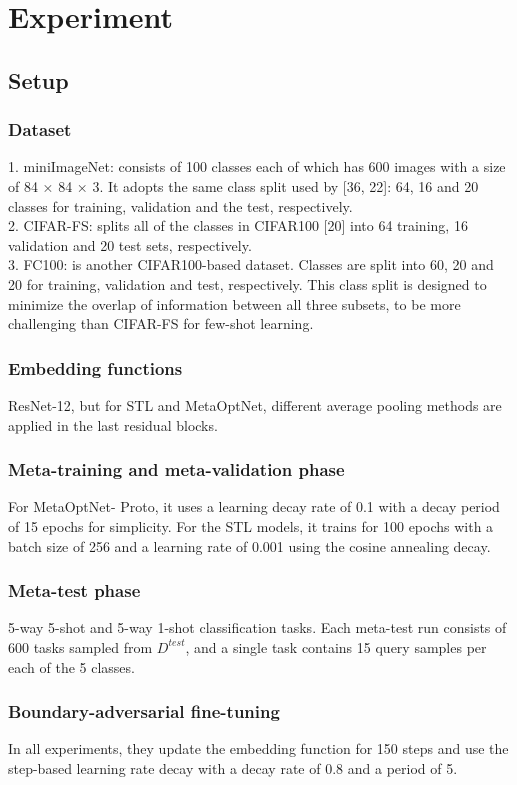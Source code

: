 \documentclass{article}
\begin{document}
\section{Experiment}
\subsection{Setup}
    \subsubsection{Dataset}
1. miniImageNet: consists of 100 classes each of which has 600 images with a size of 84 × 84 × 3. It adopts the same class split used by [36, 22]: 64, 16 and 20 classes for training, validation and the test, respectively. \\
2. CIFAR-FS: splits all of the classes in CIFAR100 [20] into 64 training, 16 validation and 20 test sets, respectively. \\
3. FC100: is another CIFAR100-based dataset. Classes are split into 60, 20 and 20 for training, validation and test, respectively. This class split is designed to minimize the overlap of information between all three subsets, to be more challenging than CIFAR-FS for few-shot learning. \\
    \subsubsection{Embedding functions}
ResNet-12, but for STL and MetaOptNet, different average pooling methods are applied in the last residual blocks. \\
    \subsubsection{Meta-training and meta-validation phase}
For MetaOptNet- Proto, it uses a learning decay rate of 0.1 with a decay period of 15 epochs for simplicity. For the STL models, it trains for 100 epochs with a batch size of 256 and a learning rate of 0.001 using the cosine annealing decay. \\
    \subsubsection{Meta-test phase}
5-way 5-shot and 5-way 1-shot classification tasks. Each meta-test run consists of 600 tasks sampled from $D^{test}$, and a single task contains 15 query samples per each of the 5 classes. \\
    \subsubsection{Boundary-adversarial fine-tuning}
In all experiments, they update the embedding function for 150 steps and use the step-based learning rate decay with a decay rate of 0.8 and a period of 5.
\end{document}
